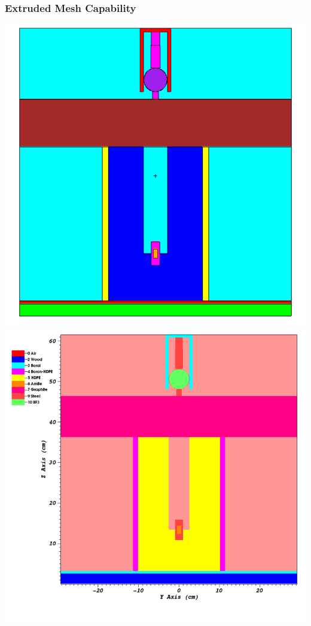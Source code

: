 \documentclass[]{beamer}
\begin{document}
\begin{frame}[t]\frametitle{Extruded Mesh Capability}
\centering
\includegraphics[scale=0.23]{figures/IM1_MCNP}
\includegraphics[scale=0.23]{figures/IM1_PDT}
\end{frame}
\end{document}

